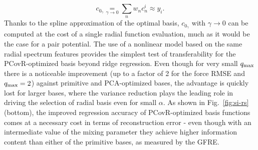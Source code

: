 \begin{equation}
  c_{0_\gamma} \underset{\gamma\rightarrow 0}{=} 
  \sum_n w_n c^i_{n} \approx y_i.
\end{equation}
Thanks to the spline approximation of the optimal basis, $c_{0_\gamma}$ with $\gamma\rightarrow 0$ can be computed at the cost of a single radial function evaluation, much as it would be the case for a pair potential. 
The use of a nonlinear model based on the same radial spectrum features provides the simplest test of transferability for the PCovR-optimized basis beyond ridge regression. 
Even though for very small $q_\mathrm{max}$ there is a noticeable improvement (up to a factor of 2 for the force RMSE and $q_\mathrm{max}=2$) against primitive and PCA-optimized bases, the advantage is quickly lost for larger bases, where the variance reduction plays the leading role in driving the selection of radial basis even for small $\alpha$.
As shown in Fig.~\ref{fig:si-rs} (bottom), the improved regression accuracy of PCovR-optimized basis functions comes at a necessary cost in terms of reconstruction error - even though with an intermediate value of the mixing parameter they achieve higher information content than either of the primitive bases, as measured by the GFRE.


